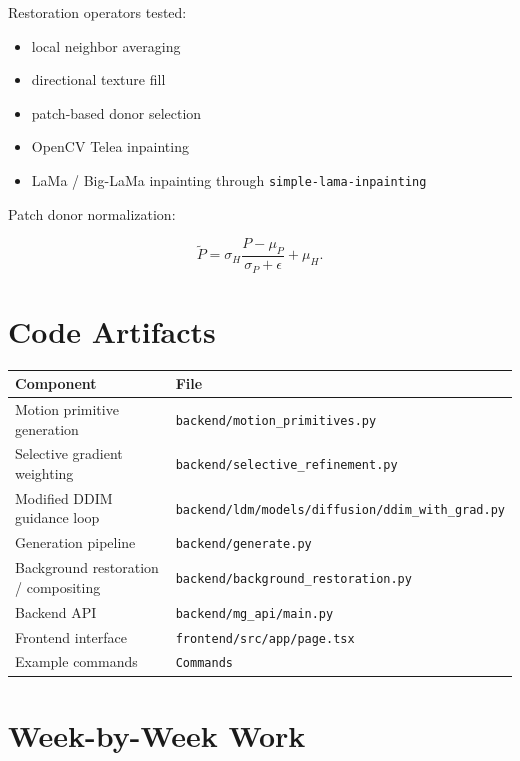 \documentclass[11pt,a4paper]{article}
\begin{document}
Restoration operators tested:

\begin{itemize}
  \item local neighbor averaging
  \item directional texture fill
  \item patch-based donor selection
  \item OpenCV Telea inpainting
  \item LaMa / Big-LaMa inpainting through \texttt{simple-lama-inpainting}
\end{itemize}

Patch donor normalization:

\begin{equation}
\tilde{P}
=
\sigma_H\frac{P-\mu_P}{\sigma_P+\epsilon}
+\mu_H.
\end{equation}

\section{Code Artifacts}

\begin{tabularx}{\textwidth}{@{}lY@{}}
\toprule
Component & File \\
\midrule
Motion primitive generation & \texttt{backend/motion\_primitives.py} \\
Selective gradient weighting & \texttt{backend/selective\_refinement.py} \\
Modified DDIM guidance loop & \texttt{backend/ldm/models/diffusion/ddim\_with\_grad.py} \\
Generation pipeline & \texttt{backend/generate.py} \\
Background restoration / compositing & \texttt{backend/background\_restoration.py} \\
Backend API & \texttt{backend/mg\_api/main.py} \\
Frontend interface & \texttt{frontend/src/app/page.tsx} \\
Example commands & \texttt{Commands} \\
\bottomrule
\end{tabularx}

\section{Week-by-Week Work}
\end{document}
